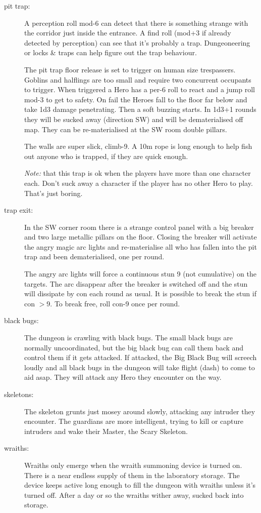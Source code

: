 \begin{description}

\item[pit trap:] A perception roll mod-6 can detect that there is something strange with the corridor just inside the entrance. A find roll (mod+3 if already detected by perception) can see that it's probably a trap. Dungeoneering or locks \& traps can help figure out the trap behaviour.

The pit trap floor release is set to trigger on human size trespassers. Goblins and halflings are too small and require two concurrent occupants to trigger. When triggered a Hero has a per-6 roll to react and a jump roll mod-3 to get to safety. On fail the Heroes fall to the floor far below and take 1d3 damage penetrating. Then a soft buzzing starts. In 1d3+1 rounds they will be sucked away (direction SW) and will be dematerialised off map. They can be re-materialised at the SW room double pillars.

The walls are super slick, climb-9. A 10m rope is long enough to help fish out anyone who is trapped, if they are quick enough.

\emph{Note:} that this trap is ok when the players have more than one character each. Don't suck away a character if the player has no other Hero to play. That's just boring.

\item[trap exit:] In the SW corner room there is a strange control panel with a big breaker and two large metallic pillars on the floor. Closing the breaker will activate the angry magic arc lights and re-materialise all who has fallen into the pit trap and been dematerialised, one per round.

The angry arc lights will force a continuous stun 9 (not cumulative) on the targets. The arc disappear after the breaker is switched off and the stun will dissipate by con each round as usual. It is possible to break the stun if con $>$9. To break free, roll con-9 once per round.

\item[black bugs:] The dungeon is crawling with black bugs. The small black bugs are normally uncoordinated, but the big black bug can call them back and control them if it gets attacked. If attacked, the Big Black Bug will screech loudly and all black bugs in the dungeon will take flight (dash) to come to aid asap. They will attack any Hero they encounter on the way.

\item[skeletons:] The skeleton grunts just mosey around slowly, attacking any intruder they encounter. The guardians are more intelligent, trying to kill or capture intruders and wake their Master, the Scary Skeleton.

\item[wraiths:] Wraiths only emerge when the wraith summoning device is turned on. There is a near endless supply of them in the laboratory storage. The device keeps active long enough to fill the dungeon with wraiths unless it's turned off. After a day or so the wraiths wither away, sucked back into storage.

\end{description}


